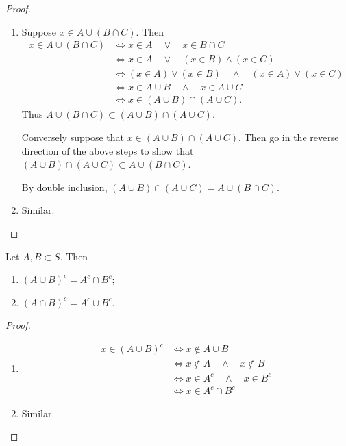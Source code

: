 \begin{proof} \
\begin{enumerate}[label=(\roman*)]
\item Suppose $x\in A\cup(B \cap C)$. Then
\begin{align*}
x\in A\cup(B \cap C)
&\iff x\in A\quad\lor\quad x\in B\cap C\\
&\iff x\in A\quad\lor\quad (x\in B)\land (x\in C)\\
&\iff (x\in A)\lor (x\in B)\quad\land\quad (x\in A)\lor (x\in C)\\
&\iff x\in A\cup B\quad\land\quad x\in A\cup C\\
&\iff x\in (A\cup B)\cap(A\cup C).
\end{align*}
Thus $A \cup (B \cap C) \subset (A \cup B) \cap (A \cup C)$.

Conversely suppose that $x \in (A \cup B) \cap (A \cup C)$. Then go in the reverse direction of the above steps to show that $(A\cup B)\cap (A\cup C)\subset A\cup(B\cap C)$.

By double inclusion, $(A\cup B)\cap(A\cup C)=A\cup(B\cap C)$.

\item Similar.
\end{enumerate}
\end{proof}

\begin{lemma}
Let $A,B\subset S$. Then
\begin{enumerate}[label=(\roman*)]
\item $(A \cup B)^c = A^c \cap B^c$;
\item $(A \cap B)^c = A^c \cup B^c$.
\end{enumerate}
\end{lemma}

\begin{proof} \
\begin{enumerate}[label=(\roman*)]
\item \begin{align*}
x\in(A\cup B)^c&\iff x\notin A\cup B\\
&\iff x\notin A\quad\land\quad x\notin B\\
&\iff x\in A^c\quad\land\quad x\in B^c\\
&\iff x\in A^c\cap B^c
\end{align*}

\item Similar.
\end{enumerate}
\end{proof}

